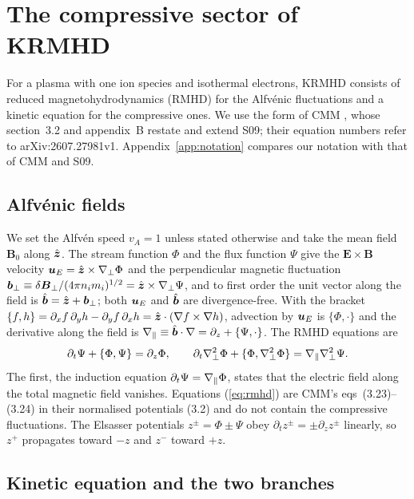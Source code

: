 \section{The compressive sector of KRMHD}\label{sec:model}

For a plasma with one ion species and isothermal electrons, KRMHD \citep{Schekochihin2009} consists of reduced magnetohydrodynamics (RMHD) for the Alfv\'enic fluctuations and a kinetic equation for the compressive ones. We use the form of CMM \citep{Chandran2026}, whose section~3.2 and appendix~B restate and extend S09; their equation numbers refer to arXiv:2607.27981v1. Appendix~\ref{app:notation} compares our notation with that of CMM and S09.

\subsection{Alfv\'enic fields}\label{mod:alfven}

We set the Alfv\'en speed $v_A=1$ unless stated otherwise and take the mean field $\boldsymbol B_0$ along $\hat{\boldsymbol z}$. The stream function $\Phi$ and the flux function $\Psi$ give the $\boldsymbol E\times\boldsymbol B$ velocity $\boldsymbol u_E=\hat{\boldsymbol z}\times\nabla_\perp\Phi$ and the perpendicular magnetic fluctuation $\boldsymbol b_\perp\equiv\delta\boldsymbol B_\perp/(4\pi n_im_i)^{1/2}=\hat{\boldsymbol z}\times\nabla_\perp\Psi$, and to first order the unit vector along the field is $\hat{\boldsymbol b}=\hat{\boldsymbol z}+\boldsymbol b_\perp$; both $\boldsymbol u_E$ and $\hat{\boldsymbol b}$ are divergence-free. With the bracket $\{f,h\}=\partial_xf\,\partial_yh-\partial_yf\,\partial_xh=\hat{\boldsymbol z}\cdot(\nabla f\times\nabla h)$, advection by $\boldsymbol u_E$ is $\{\Phi,\cdot\}$ and the derivative along the field is $\nabla_\parallel\equiv\hat{\boldsymbol b}\cdot\nabla=\partial_z+\{\Psi,\cdot\}$. The RMHD equations are \citep[eqs~17--18]{Schekochihin2009}
\begin{equation}\label{eq:rmhd}
  \partial_t\Psi+\{\Phi,\Psi\}=\partial_z\Phi,\qquad
  \partial_t\nabla_\perp^2\Phi+\{\Phi,\nabla_\perp^2\Phi\}=\nabla_\parallel\nabla_\perp^2\Psi .
\end{equation}
The first, the induction equation $\partial_t\Psi=\nabla_\parallel\Phi$, states that the electric field along the total magnetic field vanishes. Equations (\ref{eq:rmhd}) are CMM's eqs~(3.23)--(3.24) in their normalised potentials (3.2) and do not contain the compressive fluctuations. The Elsasser potentials $z^\pm=\Phi\pm\Psi$ obey $\partial_tz^\pm=\pm\partial_zz^\pm$ linearly, so $z^+$ propagates toward $-z$ and $z^-$ toward $+z$.

\subsection{Kinetic equation and the two branches}\label{mod:branches}

